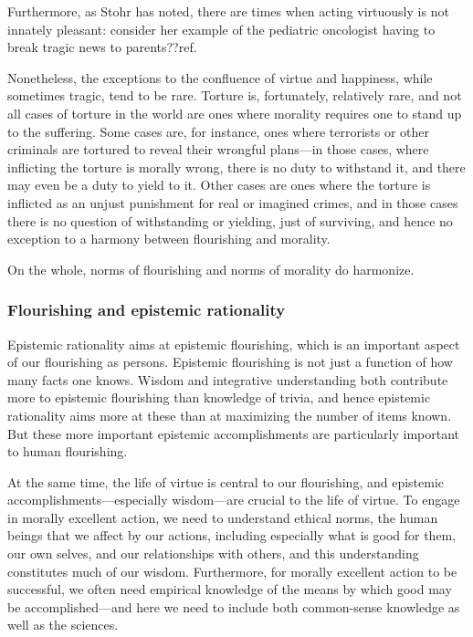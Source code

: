 Furthermore, as Stohr has noted, there are times when acting virtuously is not innately pleasant: consider her 
example of the pediatric oncologist having to break tragic news to parents??ref. 

Nonetheless, the exceptions to the confluence of virtue and happiness, while sometimes tragic, tend to be rare. 
Torture is, fortunately, relatively rare, and not all cases of torture in the world are ones where morality requires 
one to stand up to the suffering. Some cases are, for instance, ones where terrorists or other criminals are tortured
to reveal their wrongful plans---in those cases, where inflicting the torture is morally wrong, there is no duty to 
withstand it, and there may even be a duty to yield to it. Other cases are ones where the torture is inflicted 
as an unjust punishment for real or imagined crimes, and in those cases there is no question of withstanding or 
yielding, just of surviving, and hence no exception to a harmony between flourishing and morality. 

On the whole, norms of flourishing and norms of morality do harmonize.

\subsubsection{Flourishing and epistemic rationality}
Epistemic rationality aims at epistemic flourishing, which is an important aspect of our flourishing as persons.
Epistemic flourishing is not just a function of how many facts one knows. Wisdom and integrative understanding 
both contribute more to epistemic flourishing 
than knowledge of trivia, and hence epistemic rationality aims more at these than at maximizing the number of 
items known. But these more important epistemic accomplishments are particularly important to human 
flourishing.

At the same time, the life of virtue is central to our flourishing, and epistemic accomplishments---especially 
wisdom---are 
crucial to the life of virtue. To engage in morally excellent action, we need to understand ethical norms, the 
human beings that we affect by our actions, including especially what is good for them, our own selves, and our 
relationships with others, and this understanding constitutes much of our wisdom. Furthermore, for morally 
excellent action to be successful, we often need empirical knowledge of the means by which good may 
be accomplished---and here we need to include both common-sense knowledge 
as well as the sciences.


